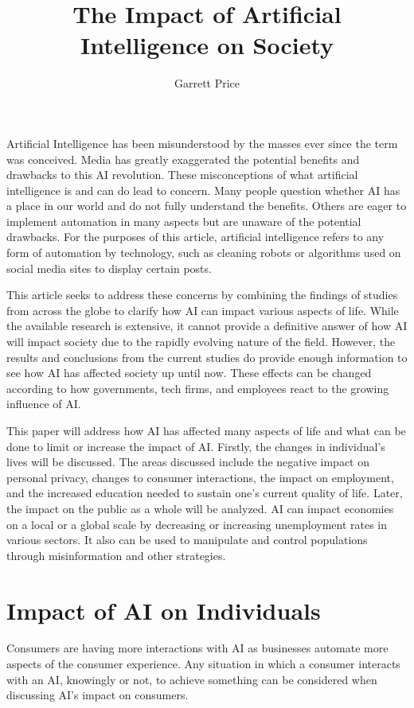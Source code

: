 \documentclass[12pt, man]{apa6}
\title{The Impact of Artificial Intelligence on Society}
\author{Garrett Price}
\affiliation{Brigham Young University}
\begin{document}
\maketitle

Artificial Intelligence has been misunderstood by the masses ever since the term was conceived.  Media has greatly exaggerated the potential
benefits and drawbacks to this AI revolution.  These misconceptions of what artificial intelligence is and can do lead to concern. Many people question
whether AI has a place in our world and do not fully understand the benefits. Others are eager to implement automation in many aspects but are unaware of the
potential drawbacks.  For the purposes of this article, artificial intelligence refers to any form of automation by technology, such as cleaning robots or algorithms used on social media sites to display certain posts.

This article seeks to address these concerns by combining the findings of studies from across the globe to clarify how AI can impact various aspects of life.  While the available research is extensive, it cannot provide a definitive answer of how AI will impact society due to the rapidly evolving nature of the field.  However, the results and conclusions from the current studies do provide enough information to see how AI has affected society up until now.  These effects can be changed according to how governments, tech firms, and employees react to the growing influence of AI.

This paper will address how AI has affected many aspects of life and what can be done to limit or increase the impact of AI.  Firstly, the changes in individual's lives will be discussed.  The areas discussed include the negative impact on personal privacy, changes to consumer interactions, the impact on employment, and the increased education needed to sustain one's current quality of life.  Later, the impact on the public as a whole will be analyzed.  AI can impact economies on a local or a global scale by decreasing or increasing unemployment rates in various sectors.  It also can be used to manipulate and control populations through misinformation and other strategies.

\section*{Impact of AI on Individuals}
Consumers are having more interactions with AI as businesses automate more aspects of the consumer experience.  Any situation in which a consumer interacts with an AI, knowingly or not, to achieve something can be considered when discussing AI's impact on consumers.\\
\end{document}
